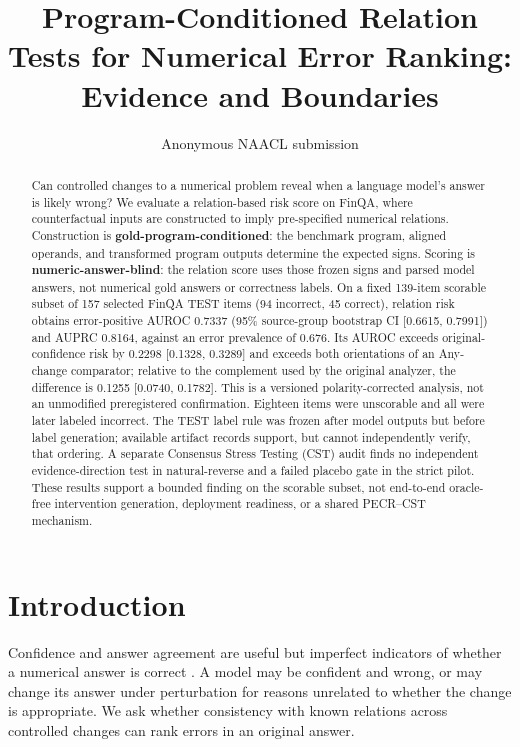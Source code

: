 \documentclass[11pt]{article}
\title{Program-Conditioned Relation Tests for Numerical Error Ranking: Evidence and Boundaries}
\author{Anonymous NAACL submission}
\begin{document}
\maketitle
\begin{abstract}
Can controlled changes to a numerical problem reveal when a language model's answer is likely wrong? We evaluate a relation-based risk score on FinQA, where counterfactual inputs are constructed to imply pre-specified numerical relations. Construction is \textbf{gold-program-conditioned}: the benchmark program, aligned operands, and transformed program outputs determine the expected signs. Scoring is \textbf{numeric-answer-blind}: the relation score uses those frozen signs and parsed model answers, not numerical gold answers or correctness labels. On a fixed 139-item scorable subset of 157 selected FinQA TEST items (94 incorrect, 45 correct), relation risk obtains error-positive AUROC 0.7337 (95\% source-group bootstrap CI [0.6615, 0.7991]) and AUPRC 0.8164, against an error prevalence of 0.676. Its AUROC exceeds original-confidence risk by 0.2298 [0.1328, 0.3289] and exceeds both orientations of an Any-change comparator; relative to the complement used by the original analyzer, the difference is 0.1255 [0.0740, 0.1782]. This is a versioned polarity-corrected analysis, not an unmodified preregistered confirmation. Eighteen items were unscorable and all were later labeled incorrect. The TEST label rule was frozen after model outputs but before label generation; available artifact records support, but cannot independently verify, that ordering. A separate Consensus Stress Testing (CST) audit finds no independent evidence-direction test in natural-reverse and a failed placebo gate in the strict pilot. These results support a bounded finding on the scorable subset, not end-to-end oracle-free intervention generation, deployment readiness, or a shared PECR--CST mechanism.
\end{abstract}

\section{Introduction}
Confidence and answer agreement are useful but imperfect indicators of whether a numerical answer is correct \citep{guo-etal-2017-calibration,wang-etal-2022-self-consistency,kuhn-etal-2023-semantic-uncertainty}. A model may be confident and wrong, or may change its answer under perturbation for reasons unrelated to whether the change is appropriate. We ask whether consistency with known relations across controlled changes can rank errors in an original answer.
\end{document}
